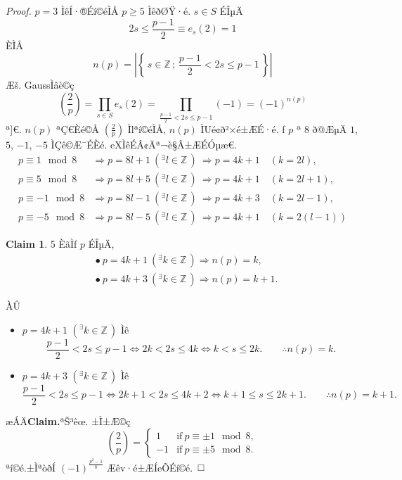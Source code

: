 \documentclass{jsarticle}
\theoremstyle{definition}
\newtheorem*{claim*}{Claim}
\newcommand{\Z}{\mathbb{Z}}
\begin{document}
\begin{proof}
$p=3$ ÌêÍ·®Éí©éÌÅ $p\geq 5$ ÌêðØŸ·é.
$s\in S$ ÉÎµÄ
\[
2s\leq \frac{p-1}{2} \equiv e_{s}(2)=1
\] ÈÌÅ
\[
n(p)=\left|\left\{\, s\in \Z\, ;\, \frac{p-1}{2}<2s\leq p-1 \,\right\}\right|
\]
Æš­.
GaussÌâè©ç
\[
\left(\frac{2}{p}\right)=\prod_{s\in S}e_{s}(2)=\prod_{\frac{p-1}{2}<2s\leq p-1}(-1) =(-1)^{n(p)}
\]
ª]€. $n(p)$ ªÇ€Èé©Å $\left(\frac{2}{p}\right)$ Ìlªí©éÌÅ, $n(p)$ ÌUé¢ð²×é±ÆÉ·é.
f $p$ ª 8 ð@ÆµÄ $1$, $5$, $-1$, $-5$ ÌÇê©Æ¯ÉÈé.
eXÌêÉÂ¢Äª¬è§Â±ÆÉÓµæ€.
\begin{align*}
p\equiv 1\mod 8&\Longrightarrow p=8l+1\ (^\exists l\in\Z\,)\ \Longrightarrow p=4k+1\quad (k=2l),
\\
p\equiv 5\mod 8&\Longrightarrow p=8l+5\ (^\exists l\in\Z\,)\ \Longrightarrow p=4k+1\quad (k=2l+1),
\\
p\equiv -1\mod 8&\Longrightarrow p=8l-1\ (^\exists l\in\Z\,)\ \Longrightarrow p=4k+3\quad (k=2l-1),
\\
p\equiv -5\mod 8&\Longrightarrow p=8l-5\ (^\exists l\in\Z\,)\ \Longrightarrow p=4k+1\quad (k=2(l-1))
\end{align*}
\newpage
\begin{claim*}
5 ÈãÌf $p$ ÉÎµÄ,
\begin{align*}
&\bullet\  p=4k+1\ (^\exists k \in \Z\,) \Longrightarrow n(p)=k,
\\
&\bullet\  p=4k+3\ (^\exists k \in \Z\,) \Longrightarrow n(p)=k+1.
\end{align*}
\end{claim*}
ÀÛ
\begin{itemize}
\item $p=4k+1$ $(^\exists k \in \Z\,)$ Ìê
\[
\frac{p-1}{2}<2s\leq p-1
\Longleftrightarrow
2k<2s\leq 4k
\Longleftrightarrow
k<s\leq 2k.
\qquad \therefore n(p)=k.
\]
\item $p=4k+3$ $(^\exists k \in \Z\,)$ Ìê
\[
\frac{p-1}{2}<2s\leq p-1
\Longleftrightarrow
2k+1<2s\leq 4k+2
\Longleftrightarrow
k+1\leq s\leq 2k+1.
\qquad
\therefore n(p)=k+1.
\]
\end{itemize}
æÁÄ\textbf{Claim.}ªŠ³êœ.
±Ì±Æ©ç
\[
\left(\frac{2}{p}\right)
=
\begin{cases}
1   &  \mathrm{if}\ p\equiv \pm 1\mod 8,
\\
-1  &  \mathrm{if}\ p\equiv \pm 5\mod 8.
\end{cases}
\]
ªí©é.±ÌªòðÍ $(-1)^{\frac{p^2-1}{8}}$ Æêv·é±ÆÍeÕÉí©é.
\end{proof}
\end{document}
